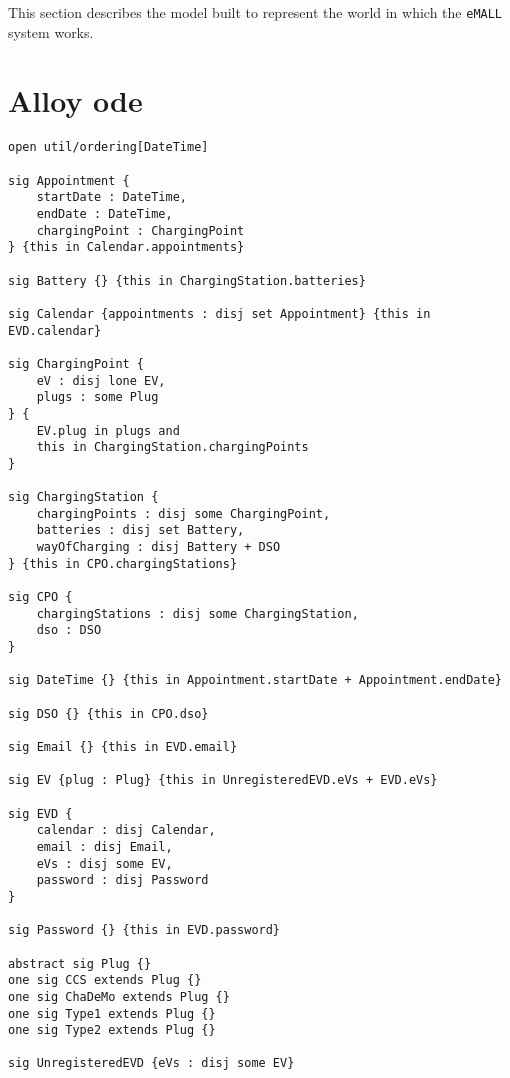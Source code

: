 This section describes the model built to represent the world in which the \verb|eMALL| system works.

\section{Alloy ode}
\label{sec: alloy}%
\begin{lstlisting}[language=alloy]
open util/ordering[DateTime]

sig Appointment {
	startDate : DateTime,
	endDate : DateTime,
	chargingPoint : ChargingPoint
} {this in Calendar.appointments}

sig Battery {} {this in ChargingStation.batteries}

sig Calendar {appointments : disj set Appointment} {this in EVD.calendar}

sig ChargingPoint {
	eV : disj lone EV,
	plugs : some Plug
} {
	EV.plug in plugs and
	this in ChargingStation.chargingPoints
}

sig ChargingStation {
	chargingPoints : disj some ChargingPoint,
	batteries : disj set Battery,
	wayOfCharging : disj Battery + DSO
} {this in CPO.chargingStations}

sig CPO {
	chargingStations : disj some ChargingStation,
	dso : DSO
}

sig DateTime {} {this in Appointment.startDate + Appointment.endDate}

sig DSO {} {this in CPO.dso}

sig Email {} {this in EVD.email}

sig EV {plug : Plug} {this in UnregisteredEVD.eVs + EVD.eVs}

sig EVD {
	calendar : disj Calendar,
	email : disj Email,
	eVs : disj some EV,
	password : disj Password
}

sig Password {} {this in EVD.password}

abstract sig Plug {}
one sig CCS extends Plug {}
one sig ChaDeMo extends Plug {}
one sig Type1 extends Plug {}
one sig Type2 extends Plug {}

sig UnregisteredEVD {eVs : disj some EV}


\end{lstlisting}
